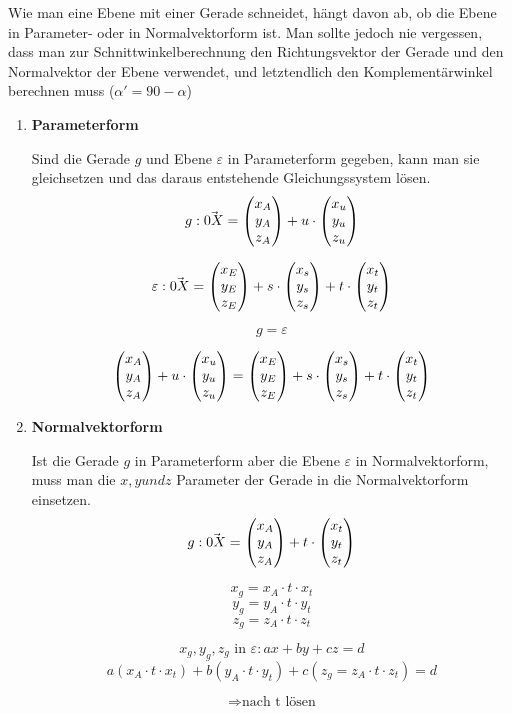 \pagebreak


Wie man eine Ebene mit einer Gerade schneidet, h\"{a}ngt davon ab, ob die Ebene in Parameter- oder in Normalvektorform ist. Man sollte jedoch nie vergessen, dass man zur Schnittwinkelberechnung den Richtungsvektor der Gerade und den Normalvektor der Ebene verwendet, und letztendlich den Komplement\"{a}rwinkel berechnen muss ($\alpha' = 90 - \alpha$)

\begin{enumerate}
  \item{\textbf{Parameterform}}

  Sind die Gerade $g$ und Ebene $\varepsilon$ in Parameterform gegeben, kann man sie gleichsetzen und das daraus entstehende Gleichungssystem l\"{o}sen.
  $$g: \vec{0X} = \begin{pmatrix}x_A \\ y_A \\ z_A\end{pmatrix} + u \cdot \begin{pmatrix}x_u \\ y_u \\ z_u\end{pmatrix}$$ 

  $$\varepsilon: \vec{0X} = \begin{pmatrix}x_E \\ y_E \\ z_E\end{pmatrix} + s \cdot \begin{pmatrix}x_s \\ y_s \\ z_s\end{pmatrix} + t \cdot \begin{pmatrix}x_t \\ y_t \\ z_t\end{pmatrix}$$ 

  $$g = \varepsilon$$ 

  $$\begin{pmatrix}x_A \\ y_A \\ z_A\end{pmatrix} + u \cdot \begin{pmatrix}x_u \\ y_u \\ z_u\end{pmatrix} = \begin{pmatrix}x_E \\ y_E \\ z_E\end{pmatrix} + s \cdot \begin{pmatrix}x_s \\ y_s \\ z_s\end{pmatrix} + t \cdot \begin{pmatrix}x_t \\ y_t \\ z_t\end{pmatrix}$$

  \item{\textbf{Normalvektorform}}

  Ist die Gerade $g$ in Parameterform aber die Ebene $\varepsilon$ in Normalvektorform, muss man die $x, y und z$ Parameter der Gerade in die Normalvektorform einsetzen. $$g: \vec{0X} = \begin{pmatrix}x_A \\ y_A \\ z_A\end{pmatrix} + t \cdot \begin{pmatrix}x_t \\ y_t \\ z_t\end{pmatrix}$$

  $$x_g = x_A \cdot t \cdot x_t$$ $$y_g = y_A \cdot t \cdot y_t$$ $$z_g = z_A \cdot t \cdot z_t$$

  $$x_g, y_g, z_g \text{ in } \varepsilon: ax + by + cz = d$$ $$ a(x_A \cdot t \cdot x_t) + b(y_A \cdot t \cdot y_t) + c(z_g = z_A \cdot t \cdot z_t) = d$$

  $$\Rightarrow \text{nach t l\"{o}sen}$$


\end{enumerate}

